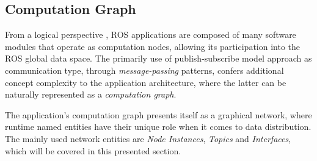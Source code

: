 

\subsection{Computation Graph}

From a logical perspective \cite{casini2019response}, ROS applications are composed of many software modules that operate as computation nodes, allowing its participation into the ROS global data space. The primarily use of publish-subscribe model approach as communication type, through \textit{message-passing} patterns, confers additional concept complexity to the application architecture, where the latter can be naturally represented as a \textit{computation graph}. 

The application's computation graph presents itself as a graphical network, where runtime named entities have their unique role when it comes to data distribution. The mainly used network entities are \textit{Node Instances}, \textit{Topics} and \textit{Interfaces}, which will be covered in this presented section.

